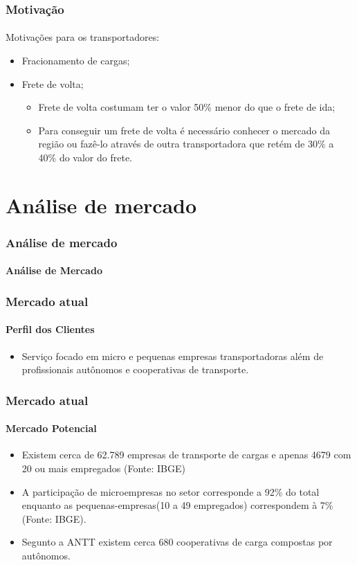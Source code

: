 \documentclass{beamer}
\begin{document}
\begin{frame}
  \frametitle{Motivação}
  \framesubtitle{}
  
  Motivações para os transportadores:
    \begin{itemize}
    \item Fracionamento de cargas;
    \item Frete de volta;
      \begin{itemize}
      \item Frete de volta costumam ter o valor 50\% menor do que o frete de ida;\\
      \item Para conseguir um frete de volta é necessário conhecer o mercado da região ou fazê-lo através de outra transportadora que retém de 30\% a 40\% do valor do frete.
      \end{itemize}
    \end{itemize}
\end{frame}


\section{Análise de mercado}

\begin{frame}
  \frametitle{Análise de mercado}
  \framesubtitle{}

  \begin{center}
    {\huge\textbf{Análise de Mercado}}

  \end{center}
\end{frame}

\begin{frame}
  \frametitle{Mercado atual}

  \framesubtitle{Perfil dos Clientes}
      \begin{itemize}
      \item Serviço focado em micro e pequenas empresas transportadoras além de profissionais autônomos e cooperativas de transporte.
      \end{itemize}
\end{frame}


\begin{frame}
  \frametitle{Mercado atual}
  \framesubtitle{Mercado Potencial}
      \begin{itemize}
      \item Existem cerca de 62.789 empresas de transporte de cargas e apenas 4679 com 20 ou mais empregados (Fonte: IBGE)
      \item A participação de microempresas no setor corresponde a 92\% do total enquanto as pequenas-empresas(10 a 49 empregados) correspondem à 7\%(Fonte: IBGE).
      \item Segunto a ANTT existem cerca 680 cooperativas de carga compostas por autônomos.
      \end{itemize}
\end{frame}
\end{document}
